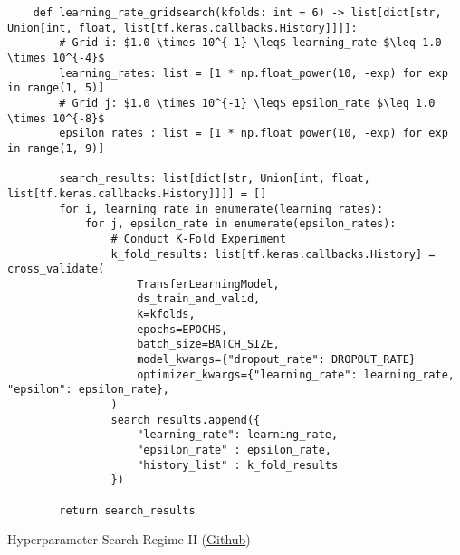 \begin{listing}[H]
    \begin{verbatim}
    def learning_rate_gridsearch(kfolds: int = 6) -> list[dict[str, Union[int, float, list[tf.keras.callbacks.History]]]]:
        # Grid i: $1.0 \times 10^{-1} \leq$ learning_rate $\leq 1.0 \times 10^{-4}$
        learning_rates: list = [1 * np.float_power(10, -exp) for exp in range(1, 5)]
        # Grid j: $1.0 \times 10^{-1} \leq$ epsilon_rate $\leq 1.0 \times 10^{-8}$
        epsilon_rates : list = [1 * np.float_power(10, -exp) for exp in range(1, 9)]

        search_results: list[dict[str, Union[int, float, list[tf.keras.callbacks.History]]]] = []
        for i, learning_rate in enumerate(learning_rates):
            for j, epsilon_rate in enumerate(epsilon_rates):
                # Conduct K-Fold Experiment
                k_fold_results: list[tf.keras.callbacks.History] = cross_validate(
                    TransferLearningModel,
                    ds_train_and_valid,
                    k=kfolds,
                    epochs=EPOCHS,
                    batch_size=BATCH_SIZE,
                    model_kwargs={"dropout_rate": DROPOUT_RATE}
                    optimizer_kwargs={"learning_rate": learning_rate, "epsilon": epsilon_rate},
                )
                search_results.append({
                    "learning_rate": learning_rate,
                    "epsilon_rate" : epsilon_rate,
                    "history_list" : k_fold_results
                })

        return search_results
    \end{verbatim}
\caption{Hyperparameter Search Regime II (\href{https://github.com/ShenZhouHong/radiography-ai-project/blob/master/python/hyperparam-search/regime-2.ipynb}{Github})}\label{listing:regime-2}
\end{listing}